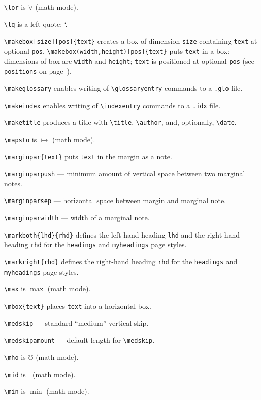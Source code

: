 \verb"\lor" is $\lor$ (math mode).

\verb"\lq" is a left-quote: \lq.

\verb"\makebox[size][pos]{text}" creates a box of dimension \verb"size"
	containing \verb"text" at optional \verb"pos".
	\verb"\makebox(width,height)[pos]{text}" puts \verb"text" in a box;
	dimensions of box are \verb"width" and \verb"height";  \verb"text"
	is positioned at optional \verb"pos"
	(see \verb"positions" on page~\pageref{pos-ref}).

\verb"\makeglossary" enables writing of \verb"\glossaryentry" commands to
	a \verb".glo" file.

\verb"\makeindex" enables writing of \verb"\indexentry" commands to a
	\verb".idx" file.

\verb"\maketitle" produces a title with \verb"\title", \verb"\author",
	and, optionally, \verb"\date".

\verb"\mapsto" is $\mapsto$ (math mode).

\verb"\marginpar{text}" puts \verb"text" in the margin as a note.

\verb"\marginparpush" --- minimum amount of vertical space between two
	marginal notes.

\verb"\marginparsep" --- horizontal space between margin and marginal note.

\verb"\marginparwidth" --- width of a marginal note.

\verb"\markboth{lhd}{rhd}" defines the left-hand heading \verb"lhd" and
	the right-hand heading \verb"rhd" for the \verb"headings" and
	\verb"myheadings" page styles.

\verb"\markright{rhd}" defines the right-hand heading \verb"rhd" for the
	\verb"headings" and \verb"myheadings" page styles.

\verb"\max" is $\max$ (math mode).

\verb"\mbox{text}" places \verb"text" into a horizontal box.

\verb"\medskip" --- standard ``medium'' vertical skip.

\verb"\medskipamount" --- default length for \verb"\medskip".

\verb"\mho" is $\mho$ (math mode).

\verb"\mid" is $\mid$ (math mode).

\verb"\min" is $\min$ (math mode).


